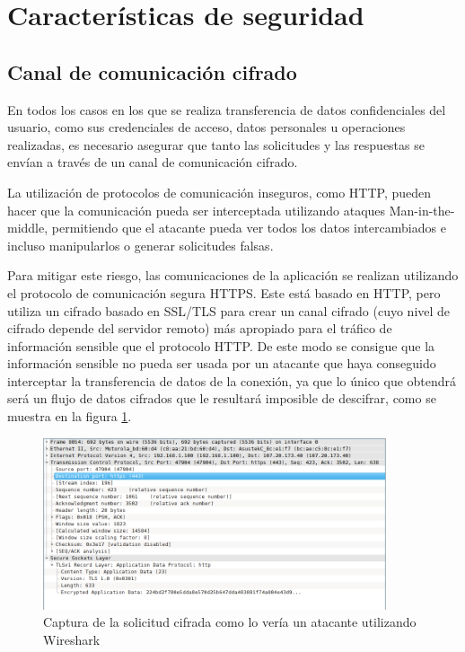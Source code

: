 \section{Características de seguridad}

\subsection{Canal de comunicación cifrado}

En todos los casos en los que se realiza transferencia de datos confidenciales del usuario, como sus credenciales de acceso, datos personales u operaciones realizadas, es necesario asegurar que tanto las solicitudes y las respuestas se envían a través de un canal de comunicación cifrado.

La utilización de protocolos de comunicación inseguros, como HTTP, pueden hacer que la comunicación pueda ser interceptada utilizando ataques \gls{Man-in-the-middle}, permitiendo que el atacante pueda ver todos los datos intercambiados e incluso manipularlos o generar solicitudes falsas.

Para mitigar este riesgo, las comunicaciones de la aplicación se realizan utilizando el protocolo de comunicación segura \gls{HTTPS}. Este está basado en HTTP, pero  utiliza un cifrado basado en \gls{SSL/TLS} para crear un canal cifrado (cuyo nivel de cifrado depende del servidor remoto) más apropiado para el tráfico de información sensible que el protocolo HTTP. De este modo se consigue que la información sensible no pueda ser usada por un atacante que haya conseguido interceptar la transferencia de datos de la conexión, ya que lo único que obtendrá será un flujo de datos cifrados que le resultará imposible de descifrar, como se muestra en la figura \ref{fig:https}.

\begin{figure}[htbp]
  \centering
    \includegraphics[width=0.9\textwidth]{imagenes/implementacion/https.png}
     \caption{Captura de la solicitud cifrada como lo vería un atacante utilizando Wireshark}
    \label{fig:https}
\end{figure}

